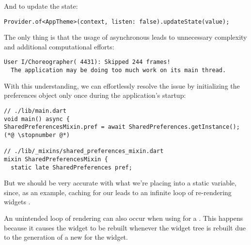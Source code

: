 \noindent And to update the state:

\begin{lstlisting}
Provider.of<AppTheme>(context, listen: false).updateState(value);
\end{lstlisting}

\noindent The only thing is that the usage of asynchronous  leads to unnecessary complexity and 
additional computational efforts:

\begin{lstlisting}[language=terminal]
User I/Choreographer( 4431): Skipped 244 frames!
  The application may be doing too much work on its main thread.
\end{lstlisting}

\noindent With this understanding, we can effortlessly resolve the issue by initializing the preferences object only 
once during the application's startup:

\begin{lstlisting}
// ./lib/main.dart
void main() async {
SharedPreferencesMixin.pref = await SharedPreferences.getInstance();(*@ \stopnumber @*)

// ./lib/_mixins/shared_preferences_mixin.dart
mixin SharedPreferencesMixin {
  static late SharedPreferences pref;
\end{lstlisting}

\noindent But we should be very accurate with what we're placing into a static variable, since, as an example, 
caching  for our  leads to an infinite loop of re-rendering widgets .

An unintended loop of rendering can also occur when using  for a . This happens 
because it causes the widget to be rebuilt whenever the widget tree is rebuilt due to the generation of a new 
 for the widget.
